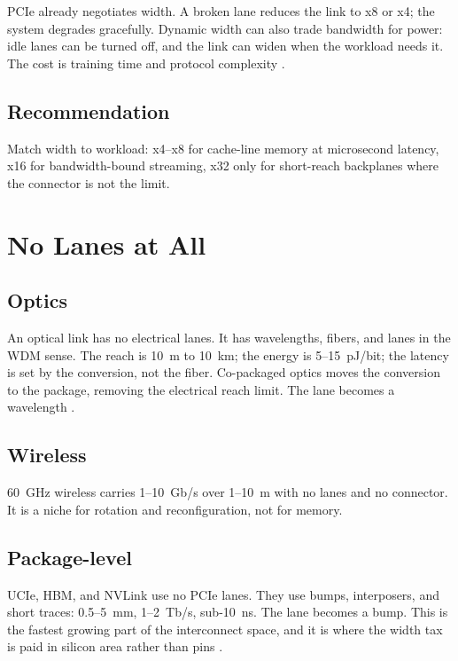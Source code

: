 \documentclass[10pt,letterpaper]{article}
\begin{document}
PCIe already negotiates width. A broken lane reduces the link to x8 or x4; the system degrades gracefully. Dynamic width can also trade bandwidth for power: idle lanes can be turned off, and the link can widen when the workload needs it. The cost is training time and protocol complexity \cite{pcie6}.

\subsection{Recommendation}

Match width to workload: x4--x8 for cache-line memory at microsecond latency, x16 for bandwidth-bound streaming, x32 only for short-reach backplanes where the connector is not the limit.

\section{No Lanes at All}
\label{sec:nolanes}

\subsection{Optics}

An optical link has no electrical lanes. It has wavelengths, fibers, and lanes in the WDM sense. The reach is 10~m to 10~km; the energy is 5--15~pJ/bit; the latency is set by the conversion, not the fiber. Co-packaged optics moves the conversion to the package, removing the electrical reach limit. The lane becomes a wavelength \cite{miller,cpo}.

\subsection{Wireless}

60~GHz wireless carries 1--10~Gb/s over 1--10~m with no lanes and no connector. It is a niche for rotation and reconfiguration, not for memory.

\subsection{Package-level}

UCIe, HBM, and NVLink use no PCIe lanes. They use bumps, interposers, and short traces: 0.5--5~mm, 1--2~Tb/s, sub-10~ns. The lane becomes a bump. This is the fastest growing part of the interconnect space, and it is where the width tax is paid in silicon area rather than pins \cite{ucie,hbm,nvlink}.
\end{document}
